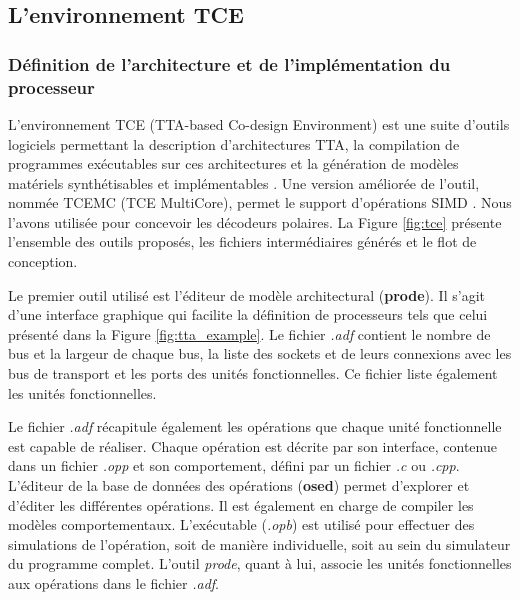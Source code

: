 \subsection{L'environnement TCE}

\subsubsection{Définition de l'architecture et de l'implémentation du processeur}

L'environnement TCE (TTA-based Co-design Environment) est une suite d'outils logiciels permettant la description d'architectures TTA, la compilation de programmes exécutables sur ces architectures et la génération de modèles matériels synthétisables et implémentables \cite{jaaskelainen_hw/sw_2017}. Une version améliorée de l'outil, nommée TCEMC (TCE MultiCore), permet le support d'opérations SIMD \cite{tcemc_2011}. Nous l'avons utilisée pour concevoir les décodeurs polaires. La Figure \ref{fig:tce} présente l'ensemble des outils proposés, les fichiers intermédiaires générés et le flot de conception.

Le premier outil utilisé est l'éditeur de modèle architectural (\textbf{prode}). Il s'agit d'une interface graphique qui facilite la définition de processeurs tels que celui présenté dans la Figure \ref{fig:tta_example}. Le fichier \textit{.adf} contient le nombre de bus et la largeur de chaque bus, la liste des sockets et de leurs connexions avec les bus de transport et les ports des unités fonctionnelles. Ce fichier liste également les unités fonctionnelles.

Le fichier \textit{.adf} récapitule également les opérations que chaque unité fonctionnelle est capable de réaliser. Chaque opération est décrite par son interface, contenue dans un fichier \textit{.opp} et son comportement, défini par un fichier \textit{.c} ou \textit{.cpp}. L'éditeur de la base de données des opérations (\textbf{osed}) permet d'explorer et d'éditer les différentes opérations. Il est également en charge de compiler les modèles comportementaux. L'exécutable (\textit{.opb}) est utilisé pour effectuer des simulations de l'opération, soit de manière individuelle, soit au sein du simulateur du programme complet. L'outil \textit{prode}, quant à lui, associe les unités fonctionnelles aux opérations dans le fichier \textit{.adf}.

